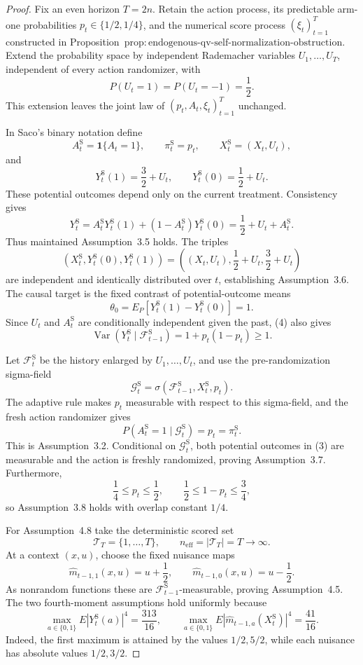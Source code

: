 \documentclass{article}
\begin{document}
\begin{proof}
Fix an even horizon \(T=2n\).  Retain the action process, its predictable arm-one probabilities \(p_t\in\{1/2,1/4\}\), and the numerical score process \((\xi_t)_{t=1}^T\) constructed in Proposition~\(\mathrm{prop:endogenous\text{-}qv\text{-}self\text{-}normalization\text{-}obstruction}\).  Extend the probability space by independent Rademacher variables \(U_1,\ldots,U_T\), independent of every action randomizer, with
\[
P(U_t=1)=P(U_t=-1)=\frac12.
\tag{1}
\]
This extension leaves the joint law of \((p_t,A_t,\xi_t)_{t=1}^T\) unchanged.

In Saco's binary notation define
\[
A_t^{\mathrm S}=\mathbf1\{A_t=1\},
\qquad \pi_t^{\mathrm S}=p_t,
\qquad X_t^{\mathrm S}=(X_t,U_t),
\tag{2}
\]
and
\[
Y_t^{\mathrm S}(1)=\frac32+U_t,
\qquad
Y_t^{\mathrm S}(0)=\frac12+U_t.
\tag{3}
\]
These potential outcomes depend only on the current treatment.  Consistency gives
\[
Y_t^{\mathrm S}
=A_t^{\mathrm S}Y_t^{\mathrm S}(1)+(1-A_t^{\mathrm S})Y_t^{\mathrm S}(0)
=\frac12+U_t+A_t^{\mathrm S}.
\tag{4}
\]
Thus maintained Assumption~3.5 holds.  The triples
\[
(X_t^{\mathrm S},Y_t^{\mathrm S}(0),Y_t^{\mathrm S}(1))
=\left((X_t,U_t),\frac12+U_t,\frac32+U_t\right)
\tag{5}
\]
are independent and identically distributed over \(t\), establishing Assumption~3.6.  The causal target is the fixed contrast of potential-outcome means
\[
\theta_0=E_P[Y_t^{\mathrm S}(1)-Y_t^{\mathrm S}(0)]=1.
\tag{6}
\]
Since \(U_t\) and \(A_t^{\mathrm S}\) are conditionally independent given the past, (4) also gives
\[
\operatorname{Var}(Y_t^{\mathrm S}\mid\mathcal F_{t-1}^{\mathrm S})
=1+p_t(1-p_t)\ge1.
\tag{7}
\]

Let \(\mathcal F_t^{\mathrm S}\) be the history enlarged by \(U_1,\ldots,U_t\), and use the pre-randomization sigma-field
\[
\mathcal G_t^{\mathrm S}=\sigma(\mathcal F_{t-1}^{\mathrm S},X_t^{\mathrm S},p_t).
\tag{8}
\]
The adaptive rule makes \(p_t\) measurable with respect to this sigma-field, and the fresh action randomizer gives
\[
P(A_t^{\mathrm S}=1\mid\mathcal G_t^{\mathrm S})=p_t=\pi_t^{\mathrm S}.
\tag{9}
\]
This is Assumption~3.2.  Conditional on \(\mathcal G_t^{\mathrm S}\), both potential outcomes in (3) are measurable and the action is freshly randomized, proving Assumption~3.7.  Furthermore,
\[
\frac14\le p_t\le\frac12,
\qquad
\frac12\le1-p_t\le\frac34,
\tag{10}
\]
so Assumption~3.8 holds with overlap constant \(1/4\).

For Assumption~4.8 take the deterministic scored set
\[
\mathcal T_T=\{1,\ldots,T\},
\qquad n_{\mathrm{eff}}=|\mathcal T_T|=T\longrightarrow\infty.
\tag{11}
\]
At a context \((x,u)\), choose the fixed nuisance maps
\[
\widehat m_{t-1,1}(x,u)=u+\frac12,
\qquad
\widehat m_{t-1,0}(x,u)=u-\frac12.
\tag{12}
\]
As nonrandom functions these are \(\mathcal F_{t-1}^{\mathrm S}\)-measurable, proving Assumption~4.5.  The two fourth-moment assumptions hold uniformly because
\[
\max_{a\in\{0,1\}}E|Y_t^{\mathrm S}(a)|^4=\frac{313}{16},
\qquad
\max_{a\in\{0,1\}}E|\widehat m_{t-1,a}(X_t^{\mathrm S})|^4=\frac{41}{16}.
\tag{13}
\]
Indeed, the first maximum is attained by the values \(1/2,5/2\), while each nuisance has absolute values \(1/2,3/2\).


\end{proof}
\end{document}
